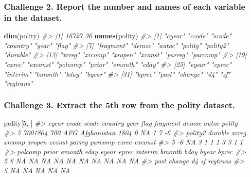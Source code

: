 \documentclass[]{book}
\newenvironment{Shaded}{\begin{snugshade}}{\end{snugshade}}
\newcommand{\KeywordTok}[1]{\textcolor[rgb]{0.13,0.29,0.53}{\textbf{#1}}}
\newcommand{\DecValTok}[1]{\textcolor[rgb]{0.00,0.00,0.81}{#1}}
\newcommand{\CommentTok}[1]{\textcolor[rgb]{0.56,0.35,0.01}{\textit{#1}}}
\newcommand{\NormalTok}[1]{#1}
\begin{document}
\subsubsection*{Challenge 2. Report the number and names of each
variable in the
dataset.}\label{challenge-2.-report-the-number-and-names-of-each-variable-in-the-dataset.}

\begin{Shaded}
\begin{Highlighting}[]
\KeywordTok{dim}\NormalTok{(polity)}
\CommentTok{#> [1] 16727    36}
\KeywordTok{names}\NormalTok{(polity)}
\CommentTok{#>  [1] "cyear"    "ccode"    "scode"    "country"  "year"     "flag"    }
\CommentTok{#>  [7] "fragment" "democ"    "autoc"    "polity"   "polity2"  "durable" }
\CommentTok{#> [13] "xrreg"    "xrcomp"   "xropen"   "xconst"   "parreg"   "parcomp" }
\CommentTok{#> [19] "exrec"    "exconst"  "polcomp"  "prior"    "emonth"   "eday"    }
\CommentTok{#> [25] "eyear"    "eprec"    "interim"  "bmonth"   "bday"     "byear"   }
\CommentTok{#> [31] "bprec"    "post"     "change"   "d4"       "sf"       "regtrans"}
\end{Highlighting}
\end{Shaded}

\subsubsection*{Challenge 3. Extract the 5th row from the polity
dataset.}\label{challenge-3.-extract-the-5th-row-from-the-polity-dataset.}

\begin{Shaded}
\begin{Highlighting}[]
\NormalTok{polity[}\DecValTok{5}\NormalTok{, ]}
\CommentTok{#>     cyear ccode scode     country year flag fragment democ autoc polity}
\CommentTok{#> 5 7001804   700   AFG Afghanistan 1804    0       NA     1     7     -6}
\CommentTok{#>   polity2 durable xrreg xrcomp xropen xconst parreg parcomp exrec exconst}
\CommentTok{#> 5      -6      NA     3      1      1      1      3       3     1       1}
\CommentTok{#>   polcomp prior emonth eday eyear eprec interim bmonth bday byear bprec}
\CommentTok{#> 5       6    NA     NA   NA    NA    NA      NA     NA   NA    NA    NA}
\CommentTok{#>   post change d4 sf regtrans}
\CommentTok{#> 5   NA     NA NA NA       NA}
\end{Highlighting}
\end{Shaded}
\end{document}
